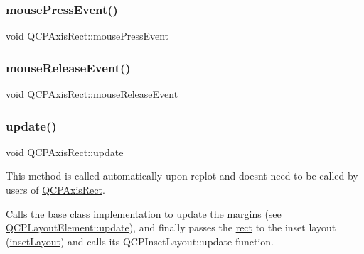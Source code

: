 \mbox{\label{class_q_c_p_color_scale_axis_rect_private_aa9a7c807eaa4666870ac94aa6abc4dde}} 
\subsubsection{\texorpdfstring{mousePressEvent()}{mousePressEvent()}}
{\footnotesize\ttfamily void Q\+C\+P\+Axis\+Rect\+::mouse\+Press\+Event\hspace{0.3cm}{\ttfamily [protected]}}

\mbox{\label{class_q_c_p_color_scale_axis_rect_private_a6c89b988d3a0b93c0878f0ebdb5037f4}} 
\subsubsection{\texorpdfstring{mouseReleaseEvent()}{mouseReleaseEvent()}}
{\footnotesize\ttfamily void Q\+C\+P\+Axis\+Rect\+::mouse\+Release\+Event\hspace{0.3cm}{\ttfamily [protected]}}

\mbox{\label{class_q_c_p_color_scale_axis_rect_private_add049d464b9ef2ccdc638adc4ccb4aca}} 
\subsubsection{\texorpdfstring{update()}{update()}}
{\footnotesize\ttfamily void Q\+C\+P\+Axis\+Rect\+::update\hspace{0.3cm}{\ttfamily [protected]}}

This method is called automatically upon replot and doesn\textquotesingle{}t need to be called by users of \mbox{\hyperlink{class_q_c_p_axis_rect}{Q\+C\+P\+Axis\+Rect}}.

Calls the base class implementation to update the margins (see \mbox{\hyperlink{class_q_c_p_layout_element_a929c2ec62e0e0e1d8418eaa802e2af9b}{Q\+C\+P\+Layout\+Element\+::update}}), and finally passes the \mbox{\hyperlink{class_q_c_p_layout_element_a208effccfe2cca4a0eaf9393e60f2dd4}{rect}} to the inset layout (\mbox{\hyperlink{class_q_c_p_axis_rect_a949f803466619924c7018df4b511ae10}{inset\+Layout}}) and calls its Q\+C\+P\+Inset\+Layout\+::update function.

